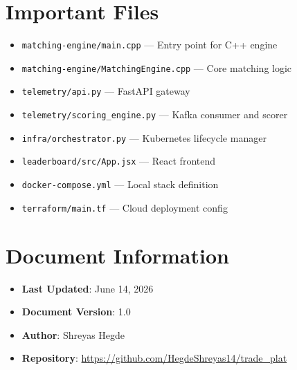 \documentclass[10pt,a4paper,oneside]{report}
\begin{document}
\section{Important Files}

\begin{itemize}
    \item \texttt{matching-engine/main.cpp} — Entry point for C++ engine
    \item \texttt{matching-engine/MatchingEngine.cpp} — Core matching logic
    \item \texttt{telemetry/api.py} — FastAPI gateway
    \item \texttt{telemetry/scoring\_engine.py} — Kafka consumer and scorer
    \item \texttt{infra/orchestrator.py} — Kubernetes lifecycle manager
    \item \texttt{leaderboard/src/App.jsx} — React frontend
    \item \texttt{docker-compose.yml} — Local stack definition
    \item \texttt{terraform/main.tf} — Cloud deployment config
\end{itemize}

\section{Document Information}

\begin{itemize}
    \item \textbf{Last Updated}: June 14, 2026
    \item \textbf{Document Version}: 1.0
    \item \textbf{Author}: Shreyas Hegde
    \item \textbf{Repository}: \url{https://github.com/HegdeShreyas14/trade_plat}
\end{itemize}
\end{document}
